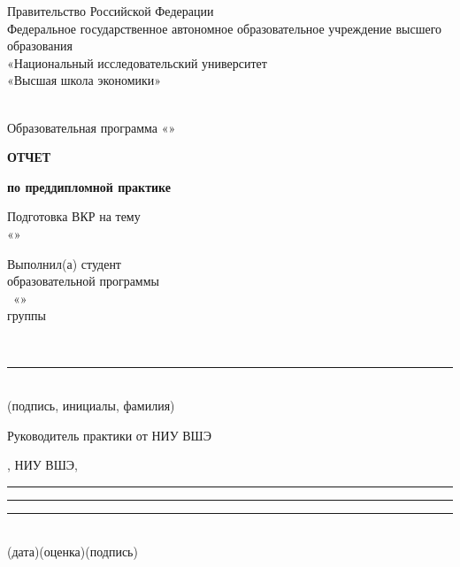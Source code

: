 \documentclass[12pt,a4paper]{extarticle}
\begin{document}
\pagestyle{empty}
\sloppy
\setlength{\parindent}{0pt}
\setlength{\parskip}{0pt}
\singlespacing

\begin{center}
Правительство Российской Федерации\\
Федеральное государственное автономное образовательное учреждение высшего образования\\
«Национальный исследовательский университет\\
«Высшая школа экономики»

\vspace{1.2em}
\hseFaculty\\
Образовательная программа \hseDegreeLevel{} «\hseSpecialization»

\vspace{2.6em}
\textbf{\large ОТЧЕТ}

\vspace{0.4em}
\textbf{по преддипломной практике}

\vspace{0.9em}
Подготовка ВКР на тему\\
«\hseProjectName»
\end{center}

\vspace{2.8em}
\noindent\hfill
\begin{minipage}[t]{0.55\textwidth}
\raggedright
Выполнил(а) студент\\
образовательной программы\\
\hseProgramCode\ «\hseSpecialization»\\
группы \hseGroup

\vspace{0.6em}
\strut\hseAuthorName\\[-0.05cm]
\rule{6cm}{0.4pt}\\[-0.05cm]
{\scriptsize (подпись, инициалы, фамилия)}
\end{minipage}

\vspace{1.6em}
Руководитель практики от НИУ ВШЭ

\smallskip
\hseSupervisorName, НИУ ВШЭ, \hseSupervisorTitle

\vspace{0.7em}
\rule{2.6cm}{0.4pt}\quad\rule{3.2cm}{0.4pt}\quad{}\rule{4.2cm}{0.4pt}\\
{\scriptsize \hspace{0.4cm}(дата)\hspace{2.4cm}(оценка)\hspace{3.2cm}(подпись)}
\end{document}
